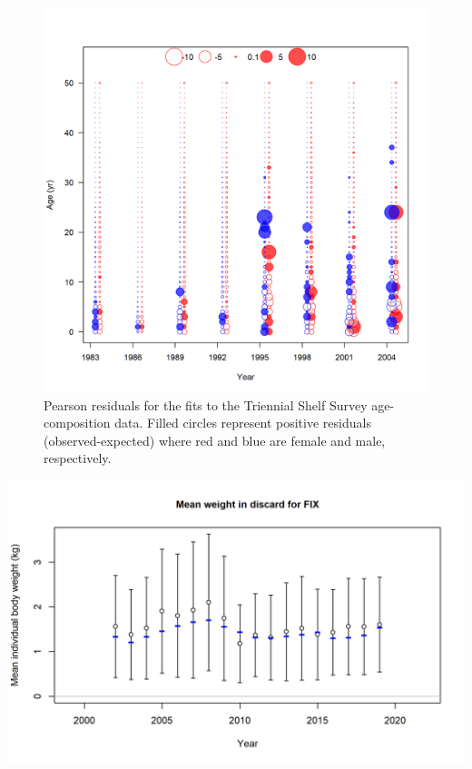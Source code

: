 \documentclass[11pt,
  english,
  a4paper,
]{article}
\begin{document}
\begin{figure}
\centering
\includegraphics[width=1\textwidth,height=1\textheight]{figs/comp_agefit_residsflt5mkt0.png}
\caption{Pearson residuals for the fits to the Triennial Shelf Survey age-composition data. Filled circles represent positive residuals (observed-expected) where red and blue are female and male, respectively. \label{fig:acomp_resid_5}}
\end{figure}

\tagmcend\tagstructend

\clearpage


\includegraphics[width=1\textwidth,height=0.75\textheight]{figs/bodywt_fit_fltFIX.png}
\end{document}
